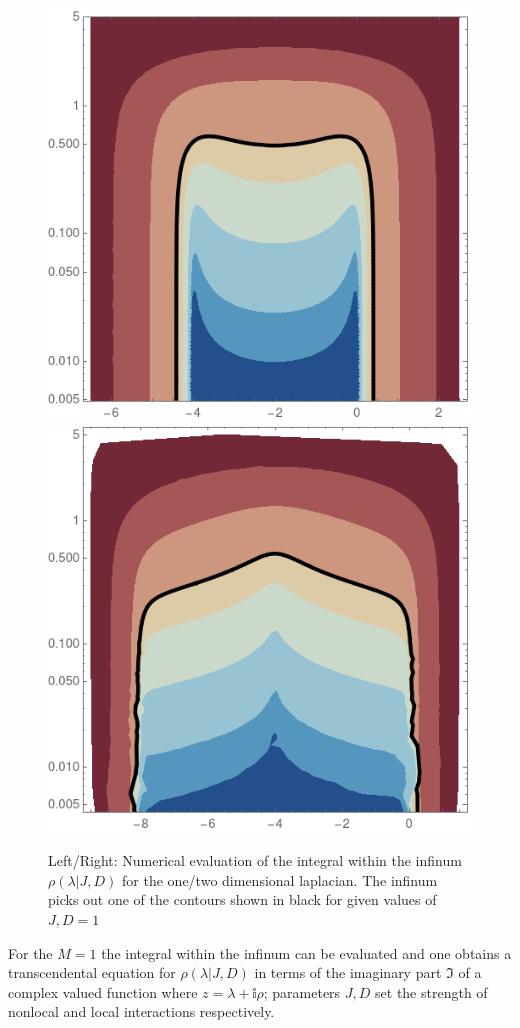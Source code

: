 \documentclass{article}[12pt]
\numberwithin{equation}{section}
\begin{document}
\begin{figure}[H]
\centering{}
\captionsetup{justification=centering}
\includegraphics[scale=0.3]{figures/1dinf}
\includegraphics[scale=0.3]{figures/2dinf}
\caption{Left/Right: Numerical evaluation of the integral within the infinum
$\rho(\lambda|J,D)$ for the one/two dimensional laplacian. The
infinum picks out one of the contours shown in black
for given values of $J,D=1$}
\label{fig:inf}
\end{figure}
For the $M=1$ the integral within the infinum can be evaluated and
one obtains a transcendental equation for $\rho(\lambda|J,D)$
in terms of the imaginary part $\Im$ of a complex valued function where
$z=\lambda+\mathbb{i}\rho$; parameters $J,D$ set the strength of
nonlocal and local interactions respectively.
\end{document}
